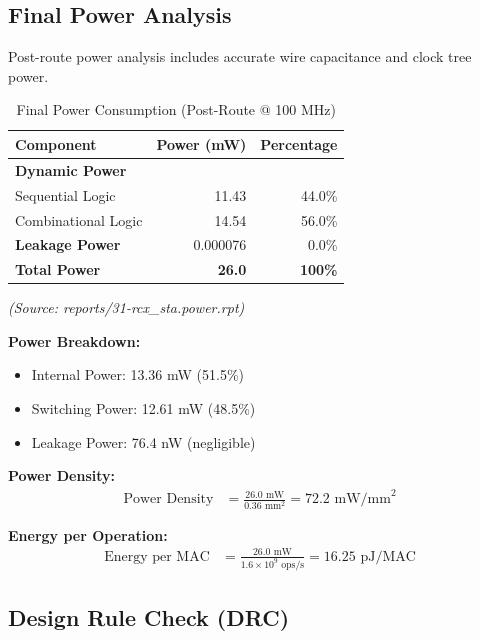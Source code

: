 \documentclass[12pt,a4paper]{article}
\begin{document}
\newpage

\subsection{Final Power Analysis}

Post-route power analysis includes accurate wire capacitance and clock tree power.

\begin{table}[H]
\centering
\caption{Final Power Consumption (Post-Route @ 100 MHz)}
\label{tab:final_power}
\begin{tabular}{@{}lrr@{}}
\toprule
\textbf{Component} & \textbf{Power (mW)} & \textbf{Percentage} \\
\midrule
\textbf{Dynamic Power} & & \\
\quad Sequential Logic & 11.43 & 44.0\% \\
\quad Combinational Logic & 14.54 & 56.0\% \\
\textbf{Leakage Power} & 0.000076 & 0.0\% \\
\midrule
\textbf{Total Power} & \textbf{26.0} & \textbf{100\%} \\
\bottomrule
\end{tabular}
\end{table}

\textit{(Source: reports/31-rcx\_sta.power.rpt)}

\textbf{Power Breakdown:}
\begin{itemize}
    \item Internal Power: 13.36 mW (51.5\%)
    \item Switching Power: 12.61 mW (48.5\%)
    \item Leakage Power: 76.4 nW (negligible)
\end{itemize}

\textbf{Power Density:}
\begin{align}
    \text{Power Density} &= \frac{26.0 \text{ mW}}{0.36 \text{ mm}^2} = 72.2 \text{ mW/mm}^2
\end{align}

\textbf{Energy per Operation:}
\begin{align}
    \text{Energy per MAC} &= \frac{26.0 \text{ mW}}{1.6 \times 10^9 \text{ ops/s}} = 16.25 \text{ pJ/MAC}
\end{align}

\newpage

\subsection{Design Rule Check (DRC)}
\end{document}
